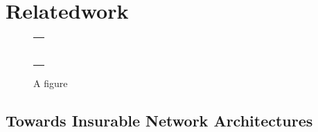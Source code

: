 \chapter{Relatedwork}
\label{chp:relatedwork} 



\begin{figure}
\centering
\begin{tabular}{@{}c@{}}
\rule{.5\textwidth}{.5\textwidth} \\
\end{tabular}
\caption{\label{fig:example}A figure}
\end{figure}

\section{Towards Insurable Network Architectures}\label{sec:first_section}

